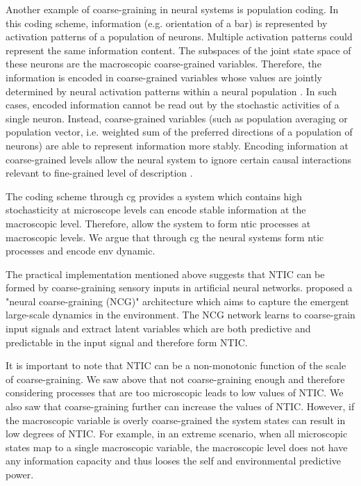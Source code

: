\documentclass[utf8]{article}
\begin{document}
		Another example of coarse-graining in neural systems is population coding. In this coding scheme, information (e.g. orientation of a bar) is represented by activation patterns of a population of neurons. Multiple activation patterns could represent the same information content. The subspaces of the joint state space of these neurons are the macroscopic coarse-grained variables. Therefore, the information is encoded in coarse-grained variables whose values are jointly determined by neural activation patterns within a neural population \citep{kristan1997population, pouget2000information, binder2009encyclopedia, QuianQuiroga2009}. In such cases, encoded information cannot be read out by the stochastic activities of a single neuron. Instead, coarse-grained variables (such as population averaging or population vector, i.e. weighted sum of the preferred directions of a population of neurons) are able to represent information more stably. Encoding information at coarse-grained levels allow the neural system to ignore certain causal interactions relevant to fine-grained level of description \citep{Woodward2007-WOOCWA}.
			
		
		The coding scheme through cg provides a system which contains high stochasticity at microscope levels can encode stable information at the macroscopic level. Therefore, allow the system to form ntic processes at macroscopic levels. We argue that through cg the neural systems form ntic processes and encode env dynamic. 


			
			
		The practical implementation mentioned above suggests that  NTIC can be formed by coarse-graining sensory inputs in artificial neural networks. \citep{guttenberg2016neural} proposed a "neural coarse-graining (NCG)" architecture which aims to capture the emergent large-scale dynamics in the environment. The NCG network learns to coarse-grain input signals and extract latent variables which are both predictive and predictable in the input signal and therefore form NTIC.

		It is important to note that NTIC can be a non-monotonic function of the scale of coarse-graining. We saw above that not coarse-graining enough and therefore considering processes that are too microscopic leads to low values of NTIC. We also saw that coarse-graining further can increase the values of NTIC. However, if the macroscopic variable is overly coarse-grained the system states can result in low degrees of NTIC. For example, in an extreme scenario, when all microscopic states map to a single macroscopic variable, the macroscopic level does not have any information capacity and thus looses the self and environmental predictive power. 
\end{document}
